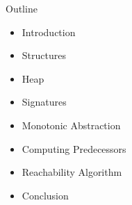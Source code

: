 \begin{frame}[fragile]{Outline}
    \begin{itemize}
        \pause
        \item <2-> Introduction
        \item <3-> Structures
        \item <4-> Heap
        \item <5-> Signatures
        \item <6-> Monotonic Abstraction
        \item <7-> Computing Predecessors
        \item <8-> Reachability Algorithm
        \item <9-> Conclusion
    \end{itemize}
\end{frame}